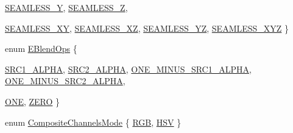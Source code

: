 \begin{DoxyCompactItemize}
\hyperlink{namespaceanl_aeb5211800782833998dbcdeddd3b7182a6274d39cc1675efe340f207582900f06}{SEAMLESS\_\-Y}, 
\hyperlink{namespaceanl_aeb5211800782833998dbcdeddd3b7182a056c68b8faaebc3f982bc4aa45c9ce85}{SEAMLESS\_\-Z}, 
\par
\hyperlink{namespaceanl_aeb5211800782833998dbcdeddd3b7182a1b3e89745cfd9cfbd3b9a466b6cd7e37}{SEAMLESS\_\-XY}, 
\hyperlink{namespaceanl_aeb5211800782833998dbcdeddd3b7182a39654e367dd6257b68371b34dcc33963}{SEAMLESS\_\-XZ}, 
\hyperlink{namespaceanl_aeb5211800782833998dbcdeddd3b7182af60fc1f195ee3efd4953a2ac13a82f08}{SEAMLESS\_\-YZ}, 
\hyperlink{namespaceanl_aeb5211800782833998dbcdeddd3b7182affa64cc544c6e6f33c6c7a6c6fd2f544}{SEAMLESS\_\-XYZ}
 \}
\item 
enum \hyperlink{namespaceanl_a7defa07650ae1bf85b1031eb93e04734}{EBlendOps} \{ \par
\hyperlink{namespaceanl_a7defa07650ae1bf85b1031eb93e04734a02bb5611b4995f7ffd04434a9d107c9c}{SRC1\_\-ALPHA}, 
\hyperlink{namespaceanl_a7defa07650ae1bf85b1031eb93e04734a504dbec0a40dd14b7648f4a7ff311869}{SRC2\_\-ALPHA}, 
\hyperlink{namespaceanl_a7defa07650ae1bf85b1031eb93e04734ab24c2e72a87da0b0354a7a13df9c5c27}{ONE\_\-MINUS\_\-SRC1\_\-ALPHA}, 
\hyperlink{namespaceanl_a7defa07650ae1bf85b1031eb93e04734a78a45c56cd708f9f319d0c4a6dc9b16a}{ONE\_\-MINUS\_\-SRC2\_\-ALPHA}, 
\par
\hyperlink{namespaceanl_a7defa07650ae1bf85b1031eb93e04734a8745683b1553a808af06df63a4ef597a}{ONE}, 
\hyperlink{namespaceanl_a7defa07650ae1bf85b1031eb93e04734a3acf43fa6ad2b45da9003d0628ca7c11}{ZERO}
 \}
\item 
enum \hyperlink{namespaceanl_a8ce7a219c5f8832dd259498378526225}{CompositeChannelsMode} \{ \hyperlink{namespaceanl_a8ce7a219c5f8832dd259498378526225a7c1fb931fc7c91123fbaa144183b7eca}{RGB}, 
\hyperlink{namespaceanl_a8ce7a219c5f8832dd259498378526225ad058d272a1066c0d0c372a839d02ad27}{HSV}
 \}
\end{DoxyCompactItemize}
